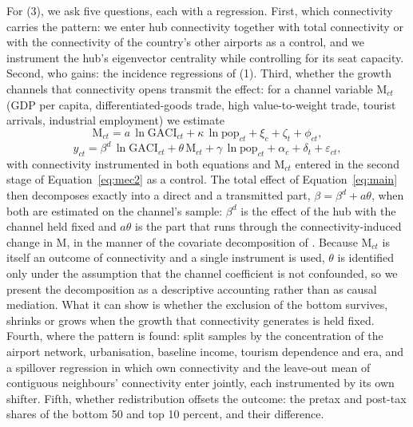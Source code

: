 For (3), we ask five questions, each with a regression. First, which connectivity carries the pattern: we enter hub connectivity together with total connectivity or with the connectivity of the country's other airports as a control, and we instrument the hub's eigenvector centrality while controlling for its seat capacity. Second, who gains: the incidence regressions of (1). Third, whether the growth channels that connectivity opens transmit the effect: for a channel variable $\mathrm{M}_{ct}$ (GDP per capita, differentiated-goods trade, high value-to-weight trade, tourist arrivals, industrial employment) we estimate
\begin{equation}
\mathrm{M}_{ct} = a\,\ln\mathrm{GACI}_{ct} + \kappa\,\ln\text{pop}_{ct} + \xi_c + \zeta_t + \phi_{ct},
\label{eq:mec1}
\end{equation}
\begin{equation}
y_{ct} = \beta^{d}\,\ln\mathrm{GACI}_{ct} + \theta\,\mathrm{M}_{ct} + \gamma\,\ln\text{pop}_{ct} + \alpha_c + \delta_t + \varepsilon_{ct},
\label{eq:mec2}
\end{equation}
with connectivity instrumented in both equations and $\mathrm{M}_{ct}$ entered in the second stage of Equation~\eqref{eq:mec2} as a control. The total effect of Equation~\eqref{eq:main} then decomposes exactly into a direct and a transmitted part, $\beta=\beta^{d}+a\theta$, when both are estimated on the channel's sample: $\beta^{d}$ is the effect of the hub with the channel held fixed and $a\theta$ is the part that runs through the connectivity-induced change in $\mathrm{M}$, in the manner of the covariate decomposition of \citet{Gelbach_2016}. Because $\mathrm{M}_{ct}$ is itself an outcome of connectivity and a single instrument is used, $\theta$ is identified only under the assumption that the channel coefficient is not confounded, so we present the decomposition as a descriptive accounting rather than as causal mediation. What it can show is whether the exclusion of the bottom survives, shrinks or grows when the growth that connectivity generates is held fixed. Fourth, where the pattern is found: split samples by the concentration of the airport network, urbanisation, baseline income, tourism dependence and era, and a spillover regression in which own connectivity and the leave-out mean of contiguous neighbours' connectivity enter jointly, each instrumented by its own shifter. Fifth, whether redistribution offsets the outcome: the pretax and post-tax shares of the bottom 50 and top 10 percent, and their difference.

